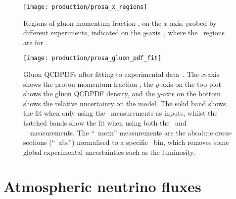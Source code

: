\begin{figure}
  \centering
  \texttt{[image: production/prosa\_x\_regions]}
  \caption{%
    Regions of gluon momentum fraction \bjorkenx, on the $x$-axis, probed by 
    different experiments, indicated on the $y$-axis~\cite{Zenaiev:2015rfa}, 
    where the \lhcb\ regions are for .
  }
  \label{fig:prod:theory:prosa_x_regions}
\end{figure}

\begin{figure}
  \centering
  \texttt{[image: production/prosa\_gluon\_pdf\_fit]}
  \caption{%
    Gluon \acp{QCDPDF} after fitting to experimental 
    data~\cite{Zenaiev:2015rfa}.
    The $x$-axis shows the proton momentum fraction \bjorkenx, the $y$-axis on 
    the top plot shows the gluon \ac{QCDPDF} density, and the $y$-axis on the 
    bottom shows the relative uncertainty on the model.
    The solid band shows the fit when only using the \hera\ measurements as 
    inputs, whilst the hatched bands show the fit when using both the \hera\ and 
    \ \lhcb\ measurements.
    The ``\lhcb\ norm'' measurements are the absolute cross-sections  (``\lhcb\ 
    abs'') normalised to a specific \pTy\ bin, which removes some global 
    experimental uncertainties such as the luminosity.
  }
  \label{fig:prod:theory:prosa_gluon_pdf_fit}
\end{figure}

\section{Atmospheric neutrino fluxes}
\label{chap:prod:theory:neutrinos}


